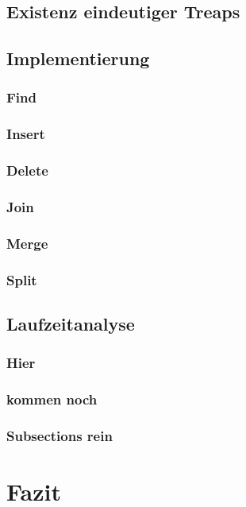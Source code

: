 \documentclass[a4paper]{scrreprt}
\theoremstyle{definition}
\begin{document}
\section{Existenz eindeutiger Treaps}
\label{sec:uniquetreaps}

\section{Implementierung}
\label{sec:implementing}

\subsection{Find}
\label{sec:find}

\subsection{Insert}
\label{sec:insert}

\subsection{Delete}
\label{sec:delete}

\subsection{Join}
\label{sec:join}

\subsection{Merge}
\label{sec:merge}

\subsection{Split}
\label{sec:split}

\section{Laufzeitanalyse}
\label{sec:runtime}

\subsection{Hier}
\label{sec:section1}

\subsection{kommen noch}
\label{sec:section2}

\subsection{Subsections rein}
\label{sec:section3}

\chapter{Fazit}
\label{sec:closing}



\end{document}
